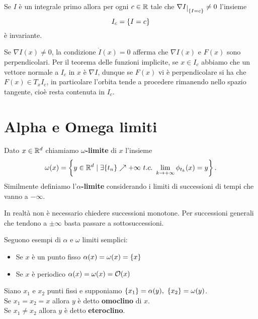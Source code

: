 \begin{corollary}\label{InvarianzaInsiemiLivelloIntegraliPrimi}
Se $I$ \`e un integrale primo allora per ogni $c\in\mathbb{R}$ tale che $\nabla I\res{\cpa{I=c}}\neq0$ l'insieme
\[I_c=\left\{{I=c}\right\}\]
\`e invariante.
\end{corollary}


\begin{remark}
Se $\nabla I(x)\neq 0$, la condizione $\dot I(x)=0$ afferma che $\nabla I(x)$ e $F(x)$ sono perpendicolari. Per il teorema delle funzioni implicite, se $x\in I_c$ abbiamo che un vettore normale a $I_c$ in $x$ \`e $\nabla I$, dunque se $F(x)$ vi \`e perpendicolare si ha che $F(x)\in T_x I_c$, in particolare l'orbita tende a procedere rimanendo nello spazio tangente, cio\`e resta contenuta in $I_c$.
\end{remark}

\section{Alpha e Omega limiti}
\begin{definition}
Dato $x\in\mathbb{R}^d$ chiamiamo \textbf{$\omega$-limite} di $x$ l'insieme
\[\omega(x)=\cpa{y\in\R^d\mid \exists \{t_n\}\nearrow +\infty\ t.c.\ \lim_{k\to+\infty}\phi_{t_k}(x)=y}.\]
Similmente definiamo l'\textbf{$\alpha$-limite} considerando i limiti di successioni di tempi che vanno a $-\infty$.
\end{definition}
\begin{remark}
In realt\`a non \`e necessario chiedere successioni monotone. Per successioni generali che tendono a $\pm\infty$ basta passare a sottosuccessioni.
\end{remark}

\begin{example}
Seguono esempi di $\alpha$ e $\omega$ limiti semplici:
\begin{itemize}
\item Se $x$ \`e un punto fisso $\alpha(x)=\omega(x)=\left\{{x}\right\}$
\item Se $x$ \`e periodico $\alpha(x)=\omega(x)=\mathcal{O}(x)$
\end{itemize}
\end{example}

\begin{definition}
Siano $x_1$ e $x_2$ punti fissi e supponiamo $\cpa{x_1}=\alpha(y),\ \cpa{x_2}=\omega(y)$.\\ 
Se $x_1=x_2=x$ allora $y$ \`e detto \textbf{omoclino} di $x$.\\
Se $x_1\neq x_2$ allora $y$ \`e detto \textbf{eteroclino}.
\end{definition}

